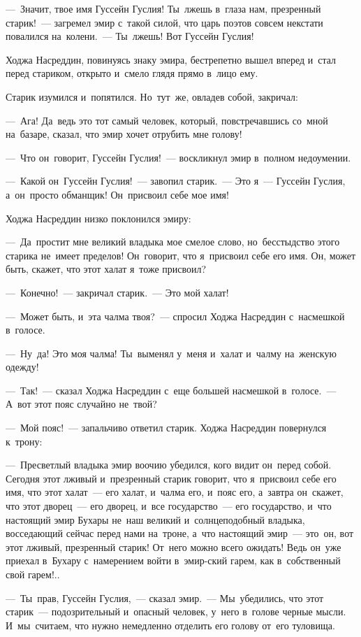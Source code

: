 \documentclass[12pt,a4paper]{book}
\begin{document}
—~Значит, твое имя Гуссейн Гуслия! Ты~лжешь в~глаза нам, презренный старик!~— загремел эмир с~такой силой, что царь поэтов совсем некстати повалился на~колени.~— Ты~лжешь! Вот Гуссейн Гуслия!

Ходжа Насреддин, повинуясь знаку эмира, бестрепетно вышел вперед и~стал перед стариком, открыто и~смело глядя прямо в~лицо ему.

Старик изумился и~попятился. Но~тут~же, овладев собой, закричал:

—~Ага! Да~ведь это тот самый человек, который, повстречавшись со~мной на~базаре, сказал, что эмир хочет отрубить мне голову!

—~Что он~говорит, Гуссейн Гуслия!~— воскликнул эмир в~полном недоумении.

—~Какой он~Гуссейн Гуслия!~— завопил старик.~— Это я~— Гуссейн Гуслия, а~он~просто обманщик! Он~присвоил себе мое имя!

Ходжа Насреддин низко поклонился эмиру:

—~Да~простит мне великий владыка мое смелое слово, но~бесстыдство этого старика не~имеет пределов! Он~говорит, что я~присвоил себе его имя. Он, может быть, скажет, что этот халат я~тоже присвоил?

—~Конечно!~— закричал старик.~— Это мой халат!

—~Может быть, и~эта чалма твоя?~— спросил Ходжа Насреддин с~насмешкой в~голосе.

—~Ну~да! Это моя чалма! Ты~выменял у~меня и~халат и~чалму на~женскую одежду!

—~Так!~— сказал Ходжа Насреддин с~еще большей насмешкой в~голосе.~— А~вот этот пояс случайно не~твой?

—~Мой пояс!~— запальчиво ответил старик. Ходжа Насреддин повернулся к~трону:

—~Пресветлый владыка эмир воочию убедился, кого видит он~перед собой. Сегодня этот лживый и~презренный старик говорит, что я~присвоил себе его имя, что этот халат~— его халат, и~чалма его, и~пояс его, а~завтра он~скажет, что этот дворец~— его дворец, и~все государство~— его государство, и~что настоящий эмир Бухары не~наш великий и~солнцеподобный владыка, восседающий сейчас перед нами на~троне, а~что настоящий эмир~— это~он, вот этот лживый, презренный старик! От~него можно всего ожидать! Ведь он~уже приехал в~Бухару с~намерением войти в~эмир-ский гарем, как в~собственный свой гарем!..

—~Ты~прав, Гуссейн Гуслия,~— сказал эмир.~— Мы~убедились, что этот старик~— подозрительный и~опасный человек, у~него в~голове черные мысли. И~мы~считаем, что нужно немедленно отделить его голову от~его туловища.
\end{document}
